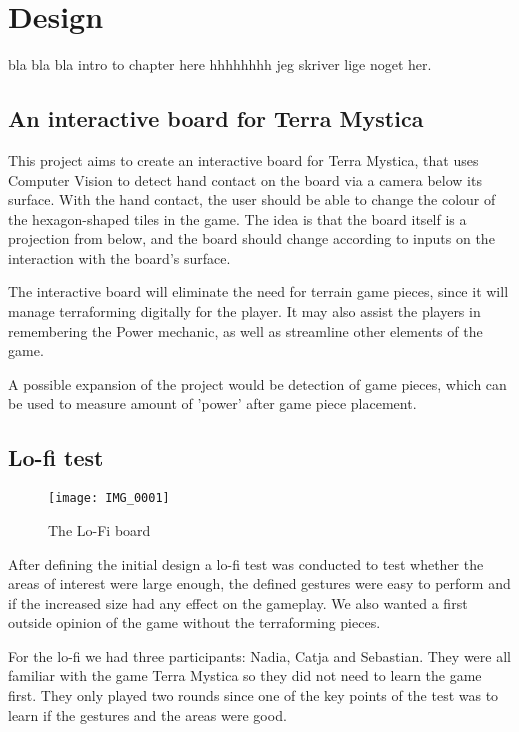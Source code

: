 \chapter{Design}\label{ch:design}
bla bla bla intro to chapter here hhhhhhhh jeg skriver lige noget her.

\section{An interactive board for Terra Mystica}
This project aims to create an interactive board for Terra Mystica, that uses Computer Vision to detect hand contact on the board via a camera below its surface. With the hand contact, the user should be able to change the colour of the hexagon-shaped tiles in the game. The idea is that the board itself is a projection from below, and the board should change according to inputs on the interaction with the board's surface.

The interactive board will eliminate the need for terrain game pieces, since it will manage terraforming digitally for the player. It may also assist the players in remembering the Power mechanic, as well as streamline other elements of the game.

A possible expansion of the project would be detection of game pieces, which can be used to measure amount of 'power' after game piece placement.

\section{Lo-fi test}
\begin{figure}
\centering 
\texttt{[image: IMG\_0001]}
\caption{The Lo-Fi board}
\end{figure} 

After defining the initial design a lo-fi test was conducted to test whether the areas of interest were large enough, the defined gestures were easy to perform and if the increased size had any effect on the gameplay. We also wanted a first outside opinion of the game without the terraforming pieces. 

For the lo-fi we had three participants: Nadia, Catja and Sebastian.  
They were all familiar with the game Terra Mystica so they did not need to learn the game first. They only played two rounds since one of the key points of the test was to learn if the gestures and the areas were good. 

